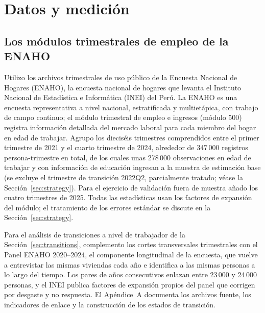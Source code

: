 \section{Datos y medición}\label{sec:data}

\subsection{Los módulos trimestrales de empleo de la ENAHO}

Utilizo los archivos trimestrales de uso público de la Encuesta Nacional de Hogares (ENAHO), la encuesta nacional de hogares que levanta el Instituto Nacional de Estadística e Informática (INEI) del Perú. La ENAHO es una encuesta representativa a nivel nacional, estratificada y multietápica, con trabajo de campo continuo; el módulo trimestral de empleo e ingresos (módulo 500) registra información detallada del mercado laboral para cada miembro del hogar en edad de trabajar. Agrupo los dieciséis trimestres comprendidos entre el primer trimestre de 2021 y el cuarto trimestre de 2024, alrededor de 347\,000 registros persona-trimestre en total, de los cuales unas 278\,000 observaciones en edad de trabajar y con información de educación ingresan a la muestra de estimación base (se excluye el trimestre de transición 2022Q2, parcialmente tratado; véase la Sección~\ref{sec:strategy}). Para el ejercicio de validación fuera de muestra añado los cuatro trimestres de 2025. Todas las estadísticas usan los factores de expansión del módulo; el tratamiento de los errores estándar se discute en la Sección~\ref{sec:strategy}.

Para el análisis de transiciones a nivel de trabajador de la Sección~\ref{sec:transitions}, complemento los cortes transversales trimestrales con el Panel ENAHO 2020--2024, el componente longitudinal de la encuesta, que vuelve a entrevistar las mismas viviendas cada año e identifica a las mismas personas a lo largo del tiempo. Los pares de años consecutivos enlazan entre 23\,000 y 24\,000 personas, y el INEI publica factores de expansión propios del panel que corrigen por desgaste y no respuesta. El Apéndice~A documenta los archivos fuente, los indicadores de enlace y la construcción de los estados de transición.

